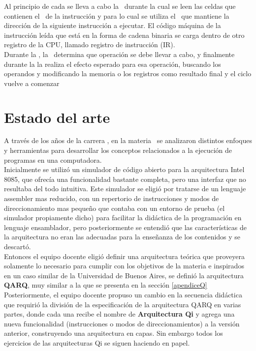 Al principio de cada \ciclo se lleva a cabo la \BI\ durante la cual se leen las celdas que contienen el \codmaq\ de la instrucción y para lo cual se utiliza el \PC\ que mantiene la dirección de la siguiente instrucción a ejecutar.
El código máquina de la instrucción leída que está en la forma de cadena binaria se carga dentro de otro registro de la CPU, llamado registro de instrucción (IR).\\

Durante la \DI, la \UC\ determina que operación se debe llevar a cabo, y finalmente durante la \EI la \UC realiza el efecto esperado para esa operación, buscando los operandos y modificando la memoria o los registros como resultado final y el ciclo vuelve a comenzar

\section{Estado del arte}

A través de los años de la carrera \tpi, en la materia \orga\ se analizaron distintos enfoques y herramientas para desarrollar los conceptos relacionados a la ejecución de programas en una computadora.\\

Inicialmente se utilizó un simulador de código abierto para la arquitectura Intel 8085, que ofrecía una funcionalidad bastante completa, pero una interfaz que no resultaba del todo intuitiva.
Este simulador se eligió por tratarse de un lenguaje assembler mas reducido, con un repertorio de instrucciones y modos de direccionamiento mas pequeño que contaba con un entorno de prueba (el simulador propiamente dicho) para facilitar la didáctica de la programación en lenguaje ensamblador, pero posteriormente se entendió que las características de la arquitectura no eran las adecuadas para la enseñanza de los contenidos y se descartó.\\
 
Entonces el equipo docente eligió definir una arquitectura teórica que proveyera solamente lo necesario para cumplir con los objetivos de la materia e inspirados en un caso similar de la Universidad de Buenos Aires, se definió la arquitectura \textbf{QARQ}, muy similar a la que se presenta en la sección \ref{apendiceQ}\\


Posteriormente, el equipo docente propuso un cambio en la secuencia didáctica que requirió la división de la especificación de la arquitectura QARQ en varias partes, donde cada una recibe el nombre de \textbf{Arquitectura Qi} y agrega una nueva funcionalidad (instrucciones o modos de direccionamientos) a la versión anterior, construyendo una arquitectura en capas. Sin embargo todos los ejercicios de las arquitecturas Qi se siguen haciendo en papel. \\


